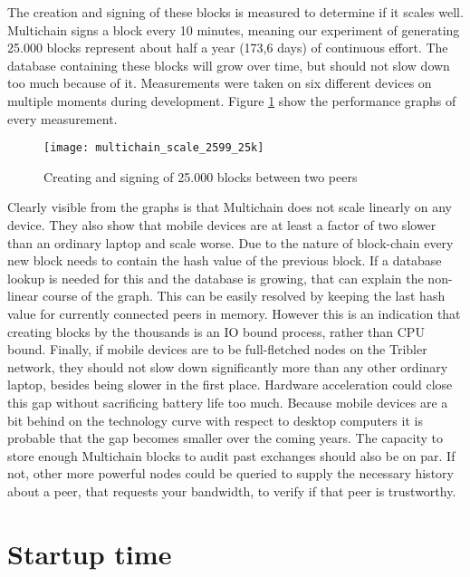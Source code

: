 The creation and signing of these blocks is measured to determine if it scales well.
Multichain signs a block every 10 minutes, meaning our experiment of generating 25.000 blocks represent about half a year (173,6 days) of continuous effort.
The database containing these blocks will grow over time, but should not slow down too much because of it.
Measurements were taken on six different devices on multiple moments during development.
Figure \ref{fig:multichain_25} show the performance graphs of every measurement.
\begin{figure}[H]
	\centering
	\texttt{[image: multichain\_scale\_2599\_25k]}
	\caption{Creating and signing of 25.000 blocks between two peers}
	\label{fig:multichain_25}
\end{figure}
Clearly visible from the graphs is that Multichain does not scale linearly on any device.
They also show that mobile devices are at least a factor of two slower than an ordinary laptop and scale worse.
Due to the nature of block-chain every new block needs to contain the hash value of the previous block.
If a database lookup is needed for this and the database is growing, that can explain the non-linear course of the graph.
This can be easily resolved by keeping the last hash value for currently connected peers in memory.
However this is an indication that creating blocks by the thousands is an IO bound process, rather than CPU bound.
Finally, if mobile devices are to be full-fletched nodes on the Tribler network, they should not slow down significantly more than any other ordinary laptop, besides being slower in the first place.
Hardware acceleration could close this gap without sacrificing battery life too much.
Because mobile devices are a bit behind on the technology curve with respect to desktop computers it is probable that the gap becomes smaller over the coming years.
The capacity to store enough Multichain blocks to audit past exchanges should also be on par.
If not, other more powerful nodes could be queried to supply the necessary history about a peer, that requests your bandwidth, to verify if that peer is trustworthy.


\section{Startup time}

